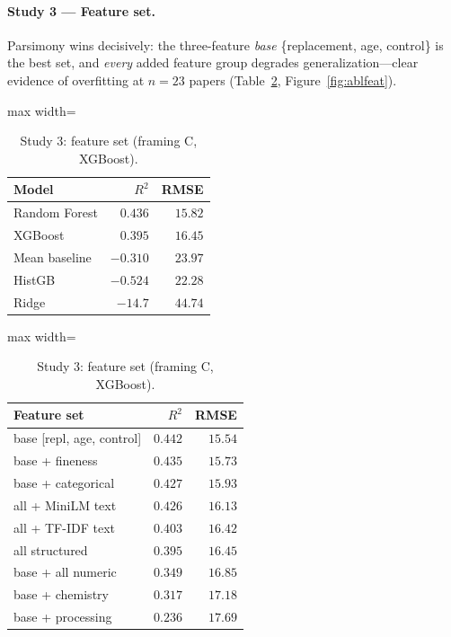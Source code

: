 \documentclass[11pt]{article}
\newcommand{\R}{$R^2$}
\begin{document}
\paragraph{Study 3 --- Feature set.}
Parsimony wins decisively: the three-feature \emph{base}
\{replacement, age, control\} is the best set, and \emph{every} added feature group
degrades generalization---clear evidence of overfitting at $n\!=\!23$ papers
(Table~\ref{tab:s3}, Figure~\ref{fig:ablfeat}).
\begin{table}[H]\centering\small
\begin{minipage}{0.46\textwidth}\centering
\caption{Study 2: model (framing C, all features).}
\label{tab:s2}
\begin{adjustbox}{max width=\linewidth}
\begin{tabular}{lrr}
\toprule
Model & \R{} & RMSE \\
\midrule
\rowcolor{green!12}Random Forest & $0.436$ & $15.82$ \\
XGBoost & $0.395$ & $16.45$ \\
Mean baseline & $-0.310$ & $23.97$ \\
HistGB & $-0.524$ & $22.28$ \\
Ridge & $-14.7$ & $44.74$ \\
\bottomrule
\end{tabular}
\end{adjustbox}
\end{minipage}\hfill
\begin{minipage}{0.5\textwidth}\centering
\caption{Study 3: feature set (framing C, XGBoost).}
\label{tab:s3}
\begin{adjustbox}{max width=\linewidth}
\begin{tabular}{lrr}
\toprule
Feature set & \R{} & RMSE \\
\midrule
\rowcolor{green!12}base [repl, age, control] & $0.442$ & $15.54$ \\
base + fineness & $0.435$ & $15.73$ \\
base + categorical & $0.427$ & $15.93$ \\
all + MiniLM text & $0.426$ & $16.13$ \\
all + TF-IDF text & $0.403$ & $16.42$ \\
all structured & $0.395$ & $16.45$ \\
base + all numeric & $0.349$ & $16.85$ \\
base + chemistry & $0.317$ & $17.18$ \\
base + processing & $0.236$ & $17.69$ \\
\bottomrule
\end{tabular}
\end{adjustbox}
\end{minipage}
\end{table}
\end{document}
